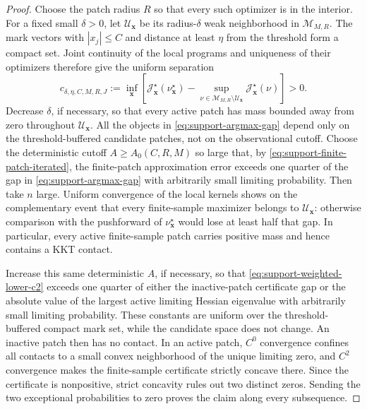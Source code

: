 \begin{proof}
Choose the patch radius \(R\) so that every such optimizer is in the interior.
For a fixed small \(\delta>0\), let
\(\mathcal U_{\boldsymbol x}\) be its radius-\(\delta\) weak neighborhood in
\(\mathcal M_{M,R}\).  The mark vectors with \(|x_j|\le C\) and distance at
least \(\eta\) from the threshold form a compact set.  Joint continuity of
the local programs and uniqueness of their optimizers therefore give the
uniform separation
\begin{equation}
\label{eq:support-argmax-gap}
 c_{\delta,\eta,C,M,R,J}
 :=\inf_{\boldsymbol x}
 \left[
  \mathcal J^\star_{\boldsymbol x}(\nu^\star_{\boldsymbol x})
  -\sup_{\nu\in\mathcal M_{M,R}\setminus\mathcal U_{\boldsymbol x}}
      \mathcal J^\star_{\boldsymbol x}(\nu)
 \right]>0.
\end{equation}
Decrease \(\delta\), if necessary, so that every active patch has mass bounded
away from zero throughout \(\mathcal U_{\boldsymbol x}\).  All the objects in
\eqref{eq:support-argmax-gap} depend only on the threshold-buffered candidate
patches, not on the observational cutoff.  Choose the deterministic cutoff
\(A\ge A_0(C,R,M)\) so large that, by
\eqref{eq:support-finite-patch-iterated}, the finite-patch approximation error
exceeds one quarter of the gap in \eqref{eq:support-argmax-gap} with
arbitrarily small limiting probability.  Then take \(n\) large.  Uniform
convergence of the local kernels shows on the complementary event that every
finite-sample maximizer belongs to \(\mathcal U_{\boldsymbol x}\): otherwise
comparison with the pushforward of \(\nu^\star_{\boldsymbol x}\) would lose at
least half that gap.  In particular, every active finite-sample patch carries
positive mass and hence contains a KKT contact.

Increase this same deterministic \(A\), if necessary, so that
\eqref{eq:support-weighted-lower-c2} exceeds one quarter of either the
inactive-patch certificate gap or the absolute value of the largest active
limiting Hessian eigenvalue with arbitrarily small limiting probability.
These constants are uniform over the threshold-buffered compact mark set,
while the candidate space does not change.  An inactive patch then has no
contact.  In an active patch,
\(C^0\) convergence confines all contacts to a small convex neighborhood of
the unique limiting zero, and \(C^2\) convergence makes the finite-sample
certificate strictly concave there.  Since the certificate is nonpositive,
strict concavity rules out two distinct zeros.  Sending the two exceptional
probabilities to zero proves the claim along every subsequence.
\end{proof}

